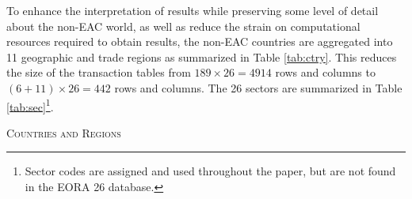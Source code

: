 \documentclass[a4paper]{article}
\begin{document}
To enhance the interpretation of results while preserving some level of detail about the non-EAC world, as well as reduce the strain on computational resources required to obtain results, the non-EAC countries are aggregated into 11 geographic and trade regions as summarized in Table \ref{tab:ctry}. This reduces the size of the transaction tables from $189 \times 26 = 4914$ rows and columns to $(6 + 11)\times 26 = 442$ rows and columns. The 26 sectors are summarized in Table \ref{tab:sec}\footnote{Sector codes are assigned and used throughout the paper, but are not found in the EORA 26 database.}. \newline







\begin{table}[h!]
\centering
\caption{\textsc{Countries and Regions}}


\end{table}
\end{document}
